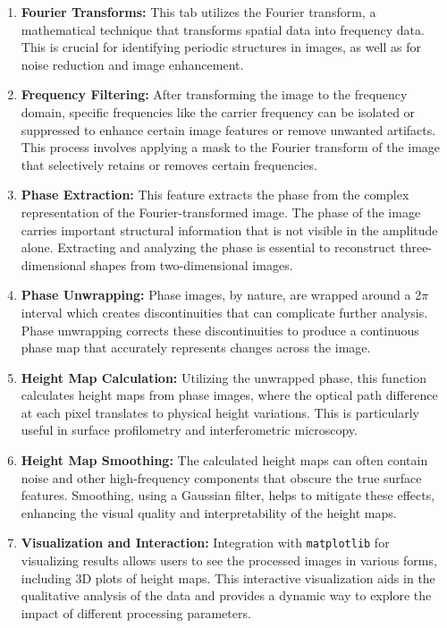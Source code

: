 \documentclass[../main.tex]{subfiles}
\begin{document}
\begin{enumerate}
    \setlength{\parskip}{3pt}
    \item \textbf{Fourier Transforms:} This tab utilizes the Fourier transform, a mathematical technique that transforms spatial data into frequency data. This is crucial for identifying periodic structures in images, as well as for noise reduction and image enhancement.
    
    \item \textbf{Frequency Filtering:} After transforming the image to the frequency domain, specific frequencies like the carrier frequency can be isolated or suppressed to enhance certain image features or remove unwanted artifacts. This process involves applying a mask to the Fourier transform of the image that selectively retains or removes certain frequencies.
    
    \item \textbf{Phase Extraction:} This feature extracts the phase from the complex representation of the Fourier-transformed image. The phase of the image carries important structural information that is not visible in the amplitude alone. Extracting and analyzing the phase is essential to reconstruct three-dimensional shapes from two-dimensional images.
    
    \item \textbf{Phase Unwrapping:} Phase images, by nature, are wrapped around a 2$\pi$ interval which creates discontinuities that can complicate further analysis. Phase unwrapping corrects these discontinuities to produce a continuous phase map that accurately represents changes across the image.
    
    \item \textbf{Height Map Calculation:} Utilizing the unwrapped phase, this function calculates height maps from phase images, where the optical path difference at each pixel translates to physical height variations. This is particularly useful in surface profilometry and interferometric microscopy.
    
    \item \textbf{Height Map Smoothing:} The calculated height maps can often contain noise and other high-frequency components that obscure the true surface features. Smoothing, using a Gaussian filter, helps to mitigate these effects, enhancing the visual quality and interpretability of the height maps.
    
    \item \textbf{Visualization and Interaction:} Integration with \texttt{matplotlib} for visualizing results allows users to see the processed images in various forms, including 3D plots of height maps. This interactive visualization aids in the qualitative analysis of the data and provides a dynamic way to explore the impact of different processing parameters.
\end{enumerate}
\end{document}
